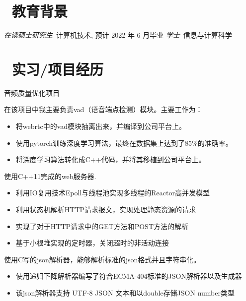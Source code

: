 \documentclass{resume}
\begin{document}



\section{\faGraduationCap\  教育背景}
\textit{在读硕士研究生}\ 计算机技术, 预计 2022 年 6 月毕业
\textit{学士}\ 信息与计算科学

\section{\faUsers\ 实习/项目经历}
 {音频质量优化项目}
\begin{onehalfspacing}
    在该项目中我主要负责vad（语音端点检测）模块。主要工作为：
    \begin{itemize}
        \item 将webrtc中的vad模块抽离出来，并编译到公司平台上。
        \item 使用pytorch训练深度学习算法，最终在数据集上达到了85\%的准确率。
        \item 将深度学习算法转化成C++代码，并将其移植到公司平台上。
    \end{itemize}
\end{onehalfspacing}


\begin{onehalfspacing}
    使用C++11完成的web服务器.
    \begin{itemize}
        \item 利用IO复用技术Epoll与线程池实现多线程的Reactor高并发模型
        \item 利用状态机解析HTTP请求报文，实现处理静态资源的请求
        \item 实现了对于HTTP请求中的GET方法和POST方法的解析
        \item 基于小根堆实现的定时器，关闭超时的非活动连接
    \end{itemize}
\end{onehalfspacing}

\begin{onehalfspacing}
    使用C写的json解析器，能够解析标准的json格式并且字符串化。
    \begin{itemize}
        \item 使用递归下降解析器编写了符合ECMA-404标准的JSON解析器以及生成器
        \item 该json解析器支持 UTF-8 JSON 文本和以double存储JSON number类型
    \end{itemize}
\end{onehalfspacing}
\end{document}
